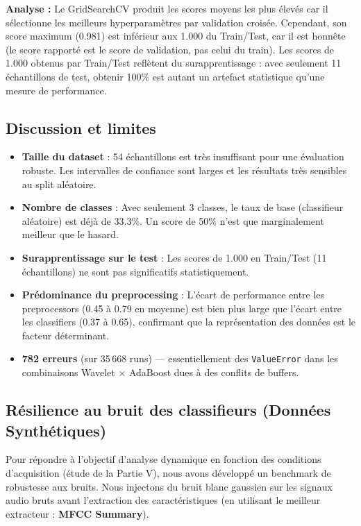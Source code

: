 \documentclass{name}
\begin{document}
\textbf{Analyse :} Le GridSearchCV produit les scores moyens les plus élevés car il sélectionne les meilleurs hyperparamètres par validation croisée. Cependant, son score maximum (0.981) est inférieur aux 1.000 du Train/Test, car il est honnête (le score rapporté est le score de validation, pas celui du train). Les scores de 1.000 obtenus par Train/Test reflètent du surapprentissage : avec seulement 11 échantillons de test, obtenir 100\% est autant un artefact statistique qu'une mesure de performance.

\subsection{Discussion et limites}

\begin{itemize}
    \item \textbf{Taille du dataset} : 54 échantillons est très insuffisant pour une évaluation robuste. Les intervalles de confiance sont larges et les résultats très sensibles au split aléatoire.
    \item \textbf{Nombre de classes} : Avec seulement 3 classes, le taux de base (classifieur aléatoire) est déjà de 33.3\%. Un score de 50\% n'est que marginalement meilleur que le hasard.
    \item \textbf{Surapprentissage sur le test} : Les scores de 1.000 en Train/Test (11 échantillons) ne sont pas significatifs statistiquement.
    \item \textbf{Prédominance du preprocessing} : L'écart de performance entre les preprocessors (0.45 à 0.79 en moyenne) est bien plus large que l'écart entre les classifiers (0.37 à 0.65), confirmant que la représentation des données est le facteur déterminant.
    \item \textbf{782 erreurs} (sur 35\,668 runs) — essentiellement des \texttt{ValueError} dans les combinaisons Wavelet $\times$ AdaBoost dues à des conflits de buffers.
\end{itemize}

\subsection{Résilience au bruit des classifieurs (Données Synthétiques)}

Pour répondre à l'objectif d'analyse dynamique en fonction des conditions d'acquisition (étude de la Partie V), nous avons développé un benchmark de robustesse aux bruits. Nous injectons du bruit blanc gaussien sur les signaux audio bruts avant l'extraction des caractéristiques (en utilisant le meilleur extracteur : \textbf{MFCC Summary}). 
\end{document}
